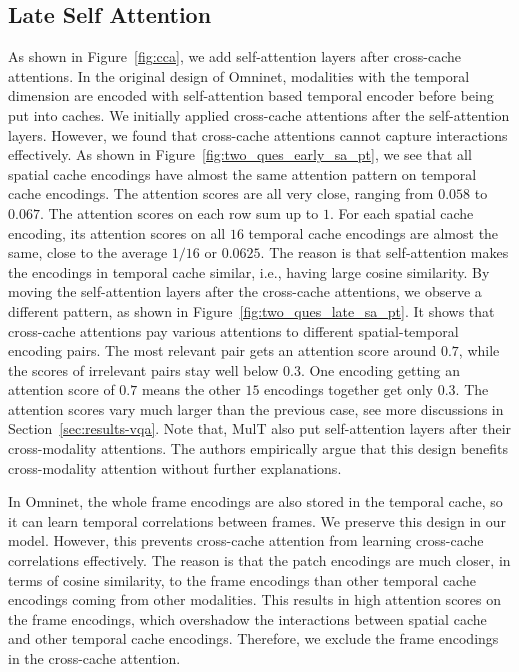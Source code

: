 \documentclass{article}
\begin{document}


\subsection{Late Self Attention}

As shown in Figure~\ref{fig:cca}, we add self-attention layers after cross-cache attentions. In the original design of Omninet, modalities with the temporal dimension are encoded with self-attention based temporal encoder before being put into caches. We initially applied cross-cache attentions after the self-attention layers. However, we found that cross-cache attentions cannot capture interactions effectively. As shown in Figure~\ref{fig:two_ques_early_sa_pt}, we see that all spatial cache encodings have almost the same attention pattern on temporal cache encodings. The attention scores are all very close, ranging from $0.058$ to $0.067$. The attention scores on each row sum up to $1$. For each spatial cache encoding, its attention scores on all $16$ temporal cache encodings are almost the same, close to the average $1/16$ or $0.0625$. The reason is that self-attention makes the encodings in temporal cache similar, i.e., having large cosine similarity. By moving the self-attention layers after the cross-cache attentions, we observe a different pattern, as shown in Figure~\ref{fig:two_ques_late_sa_pt}. It shows that cross-cache attentions pay various attentions to different spatial-temporal encoding pairs. The most relevant pair gets an attention score around $0.7$, while the scores of irrelevant pairs stay well below $0.3$. One encoding getting an attention score of $0.7$ means the other $15$ encodings together get only $0.3$. The attention scores vary much larger than the previous case, see more discussions in Section~\ref{sec:results-vqa}. Note that, MulT \cite{tsai2019multimodal} also put self-attention layers after their cross-modality attentions. The authors empirically argue that this design benefits cross-modality attention without further explanations. %

In Omninet, the whole frame encodings are also stored in the temporal cache, so it can learn temporal correlations between frames. We preserve this design in our model. However, this prevents cross-cache attention from learning cross-cache correlations effectively. The reason is that the patch encodings are much closer, in terms of cosine similarity, to the frame encodings than other temporal cache encodings coming from other modalities. This results in high attention scores on the frame encodings, which overshadow the interactions between spatial cache and other temporal cache encodings. Therefore, we exclude the frame encodings in the cross-cache attention.
\end{document}
